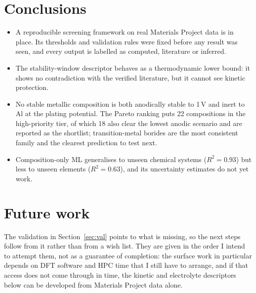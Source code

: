 \section{Conclusions}
\begin{itemize}[leftmargin=*,itemsep=2pt]
\item A reproducible screening framework on real Materials Project data is in place. Its thresholds and validation rules were fixed before any result was seen, and every output is labelled as computed, literature or inferred.
\item The stability-window descriptor behaves as a thermodynamic lower bound: it shows no contradiction with the verified literature, but it cannot see kinetic protection.
\item No stable metallic composition is both anodically stable to 1\,V and inert to Al at the plating potential. The Pareto ranking puts 22 compositions in the high-priority tier, of which 18 also clear the lowest anodic scenario and are reported as the shortlist; transition-metal borides are the most consistent family and the clearest prediction to test next.
\item Composition-only ML generalises to unseen chemical systems ($R^2 = 0.93$) but less to unseen elements ($R^2 = 0.63$), and its uncertainty estimates do not yet work.
\end{itemize}


\section{Future work}
\label{sec:plan}

The validation in Section~\ref{sec:val} points to what is missing, so the next steps follow from it rather than from a wish list. They are given in the order I intend to attempt them, not as a guarantee of completion: the surface work in particular depends on DFT software and HPC time that I still have to arrange, and if that access does not come through in time, the kinetic and electrolyte descriptors below can be developed from Materials Project data alone.


